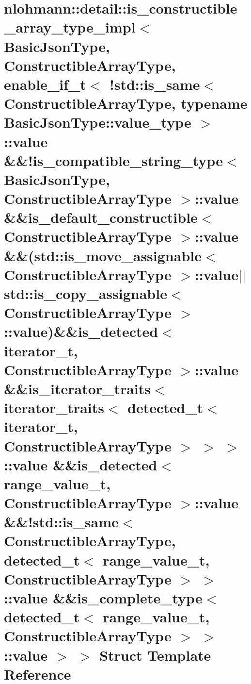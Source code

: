\hypertarget{structnlohmann_1_1detail_1_1is__constructible__array__type__impl_3_01BasicJsonType_00_01Construc9fb32d79d2f03f291695c23371cb431d}{}\section{nlohmann\+:\+:detail\+:\+:is\+\_\+constructible\+\_\+array\+\_\+type\+\_\+impl$<$ Basic\+Json\+Type, Constructible\+Array\+Type, enable\+\_\+if\+\_\+t$<$ !std\+:\+:is\+\_\+same$<$ Constructible\+Array\+Type, typename Basic\+Json\+Type\+:\+:value\+\_\+type $>$\+:\+:value \&\&!is\+\_\+compatible\+\_\+string\+\_\+type$<$ Basic\+Json\+Type, Constructible\+Array\+Type $>$\+:\+:value \&\&is\+\_\+default\+\_\+constructible$<$ Constructible\+Array\+Type $>$\+:\+:value \&\&(std\+:\+:is\+\_\+move\+\_\+assignable$<$ Constructible\+Array\+Type $>$\+:\+:value$\vert$$\vert$std\+:\+:is\+\_\+copy\+\_\+assignable$<$ Constructible\+Array\+Type $>$\+:\+:value)\&\&is\+\_\+detected$<$ iterator\+\_\+t, Constructible\+Array\+Type $>$\+:\+:value \&\&is\+\_\+iterator\+\_\+traits$<$ iterator\+\_\+traits$<$ detected\+\_\+t$<$ iterator\+\_\+t, Constructible\+Array\+Type $>$ $>$ $>$\+:\+:value \&\&is\+\_\+detected$<$ range\+\_\+value\+\_\+t, Constructible\+Array\+Type $>$\+:\+:value \&\&!std\+:\+:is\+\_\+same$<$ Constructible\+Array\+Type, detected\+\_\+t$<$ range\+\_\+value\+\_\+t, Constructible\+Array\+Type $>$ $>$\+:\+:value \&\&is\+\_\+complete\+\_\+type$<$ detected\+\_\+t$<$ range\+\_\+value\+\_\+t, Constructible\+Array\+Type $>$ $>$\+:\+:value $>$ $>$ Struct Template Reference}
